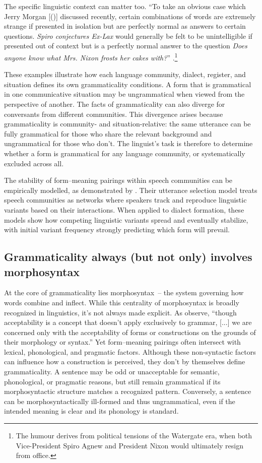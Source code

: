 The specific linguistic context can matter too. ``To take an obvious case which Jerry Morgan [(\citeyear{morgan1973})] discussed recently, certain combinations of words are extremely strange if presented in isolation but are perfectly normal as answers to
certain questions. \textit{Spiro conjectures Ex-Lax} would generally be felt to be unintelligible if presented out of context but is a perfectly normal answer to the question
\textit{Does anyone know what Mrs. Nixon frosts her cakes with?}'' \autocite[252, italics added]{McCawley1974}.\footnote{The humour derives from political tensions of the Watergate era, when both Vice-President Spiro Agnew and President Nixon would ultimately resign from office.}

These examples illustrate how each language community, dialect, register, and situation defines its own grammaticality conditions. A form that is grammatical in one communicative situation may be ungrammatical when viewed from the perspective of another. The facts of grammaticality can also diverge for conversants from different communities. This divergence arises because grammaticality is community- and situation-relative: the same utterance can be fully grammatical for those who share the relevant background and ungrammatical for those who don't. The linguist’s task is therefore to determine whether a form is grammatical for any language community, or systematically excluded across all.

The stability of form--meaning pairings within speech communities can be empirically modelled, as demonstrated by \textcite{blythe2009speech}. Their utterance selection model treats speech communities as networks where speakers track and reproduce linguistic variants based on their interactions. When applied to dialect formation, these models show how competing linguistic variants spread and eventually stabilize, with initial variant frequency strongly predicting which form will prevail.

\subsection{Grammaticality always (but not only) involves morphosyntax} \label{sec:involves-morphosyntax}

At the core of grammaticality lies morphosyntax~-- the system governing how words combine and inflect. While this centrality of morphosyntax is broadly recognized in linguistics, it's not always made explicit. As \textcite[33]{Quirk1972} observe, \enquote{though acceptability is a concept that doesn't apply exclusively to grammar, [...] we are concerned only with the acceptability of forms or constructions on the grounds of their morphology or syntax.} Yet form--meaning pairings often intersect with lexical, phonological, and pragmatic factors. Although these non-syntactic factors can influence how a construction is perceived, they don't by themselves define grammaticality. A sentence may be odd or unacceptable for semantic, phonological, or pragmatic reasons, but still remain grammatical if its morphosyntactic structure matches a recognized pattern. Conversely, a sentence can be morphosyntactically ill-formed and thus ungrammatical, even if the intended meaning is clear and its phonology is standard.


